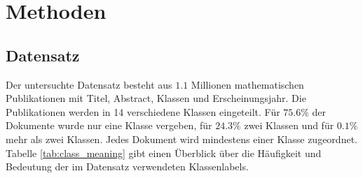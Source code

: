 \section{Methoden}


\subsection{Datensatz}
\label{sub:datensatz}
Der untersuchte Datensatz besteht aus $1.1$ Millionen mathematischen Publikationen mit Titel, Abstract, Klassen und Erscheinungsjahr.
Die Publikationen werden in 14 verschiedene Klassen eingeteilt.
Für $75.6 \%$ der Dokumente wurde nur eine Klasse vergeben, für $24.3 \%$ zwei Klassen und für $0.1 \%$ mehr als zwei Klassen.
Jedes Dokument wird mindestens einer Klasse zugeordnet.
Tabelle \ref{tab:class_meaning} gibt einen Überblick über die Häufigkeit und Bedeutung der im Datensatz verwendeten Klassenlabels.


